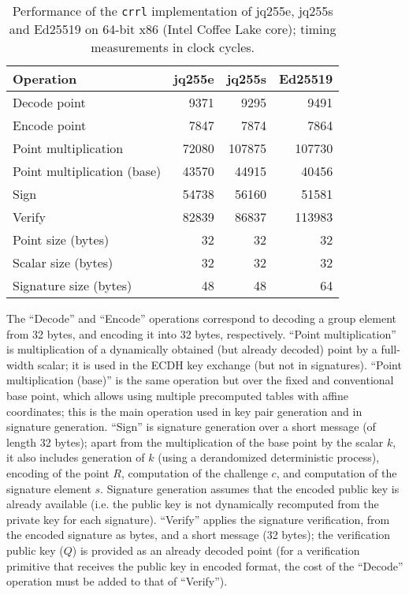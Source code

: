 \documentclass{llncs}
\begin{document}
\begin{table}[H]
    \begin{center}
\begin{tabular}{|l|r|r|r|}
\hline
\textsf{\textbf{Operation}} &
\textsf{\textbf{jq255e}} &
\textsf{\textbf{jq255s}} &
\textsf{\textbf{Ed25519}} \\
\hline
    Decode point                 &   9371 &   9295 &   9491 \\
    Encode point                 &   7847 &   7874 &   7864 \\
    Point multiplication         &  72080 & 107875 & 107730 \\
    Point multiplication (base)  &  43570 &  44915 &  40456 \\
    Sign                         &  54738 &  56160 &  51581 \\
    Verify                       &  82839 &  86837 & 113983 \\
\hline
    Point size (bytes)           &     32 &     32 &     32 \\
    Scalar size (bytes)          &     32 &     32 &     32 \\
    Signature size (bytes)       &     48 &     48 &     64 \\
\hline
\end{tabular}
    \end{center}
    \caption{\label{tab:perf-crrl}Performance of the \texttt{crrl}
    implementation of jq255e, jq255s and Ed25519 on 64-bit x86
    (Intel Coffee Lake core); timing measurements in clock cycles.}
\end{table}

The ``Decode'' and ``Encode'' operations correspond to decoding a group
element from 32 bytes, and encoding it into 32 bytes, respectively.
``Point multiplication'' is multiplication of a dynamically obtained
(but already decoded) point by a full-width scalar; it is used in
the ECDH key exchange (but not in signatures). ``Point multiplication
(base)'' is the same operation but over the fixed and conventional base
point, which allows using multiple precomputed tables with affine
coordinates; this is the main operation used in key pair generation and
in signature generation. ``Sign'' is signature generation over a short
message (of length 32 bytes); apart from the multiplication of the base
point by the scalar $k$, it also includes generation of $k$ (using a
derandomized deterministic process), encoding of the point $R$,
computation of the challenge $c$, and computation of the signature
element $s$. Signature generation assumes that the encoded public key is
already available (i.e. the public key is not dynamically recomputed
from the private key for each signature). ``Verify'' applies the
signature verification, from the encoded signature as bytes, and a short
message (32 bytes); the verification public key ($Q$) is provided as an
already decoded point (for a verification primitive that receives the
public key in encoded format, the cost of the ``Decode'' operation must
be added to that of ``Verify'').
\end{document}
